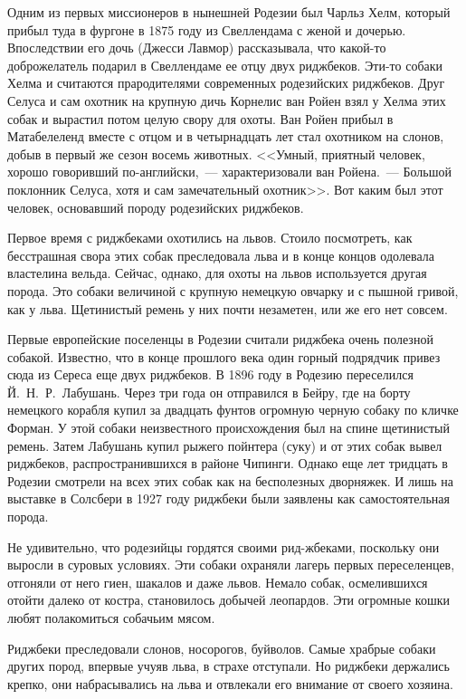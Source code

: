 \documentclass[12pt,a4paper,twoside,openany,svgnames]{memoir}
\begin{document}
Одним из первых миссионеров в нынешней Родезии был Чарльз Хелм, который прибыл туда в фургоне в 1875 году из Свеллендама с женой и дочерью. Впоследствии его дочь (Джесси Лавмор) рассказывала, что какой-то доброжелатель подарил в Свеллендаме ее отцу двух риджбеков. Эти-то собаки Хелма и считаются прародителями современных родезийских риджбеков. Друг Селуса и сам охотник на крупную дичь Корнелис ван Ройен взял у Хелма этих собак и вырастил потом целую свору для охоты. Ван Ройен прибыл в Матабелеленд вместе с отцом и в четырнадцать лет стал охотником на слонов, добыв в первый же сезон восемь животных. <<Умный, приятный человек, хорошо говоривший по-английски,~--- характеризовали ван Ройена.~--- Большой поклонник Селуса, хотя и сам замечательный охотник>>. Вот каким был этот человек, основавший породу родезийских риджбеков.

Первое время с риджбеками охотились на львов. Стоило посмотреть, как бесстрашная свора этих собак преследовала льва и в конце концов одолевала властелина вельда. Сейчас, однако, для охоты на львов используется другая порода. Это собаки величиной с крупную немецкую овчарку и с пышной гривой, как у льва. Щетинистый ремень у них почти незаметен, или же его нет совсем.

Первые европейские поселенцы в Родезии считали риджбека очень полезной собакой. Известно, что в конце прошлого века один горный подрядчик привез сюда из Сереса еще двух риджбеков. В 1896 году в Родезию переселился Й.~Н.~Р.~Лабушань. Через три года он отправился в Бейру, где на борту немецкого корабля купил за двадцать фунтов огромную черную собаку по кличке Форман. У этой собаки неизвестного происхождения был на спине щетинистый ремень. Затем Лабушань купил рыжего пойнтера (суку) и от этих собак вывел риджбеков, распространившихся в районе Чипинги. Однако еще лет тридцать в Родезии смотрели на всех этих собак как на бесполезных дворняжек. И лишь на выставке в Солсбери в 1927 году риджбеки были заявлены как самостоятельная порода.

Не удивительно, что родезийцы гордятся своими рид-жбеками, поскольку они выросли в суровых условиях. Эти собаки охраняли лагерь первых переселенцев, отгоняли от него гиен, шакалов и даже львов. Немало собак, осмелившихся отойти далеко от костра, становилось добычей леопардов. Эти огромные кошки любят полакомиться собачьим мясом.

Риджбеки преследовали слонов, носорогов, буйволов. Самые храбрые собаки других пород, впервые учуяв льва, в страхе отступали. Но риджбеки держались крепко, они набрасывались на льва и отвлекали его внимание от своего хозяина.
\end{document}
